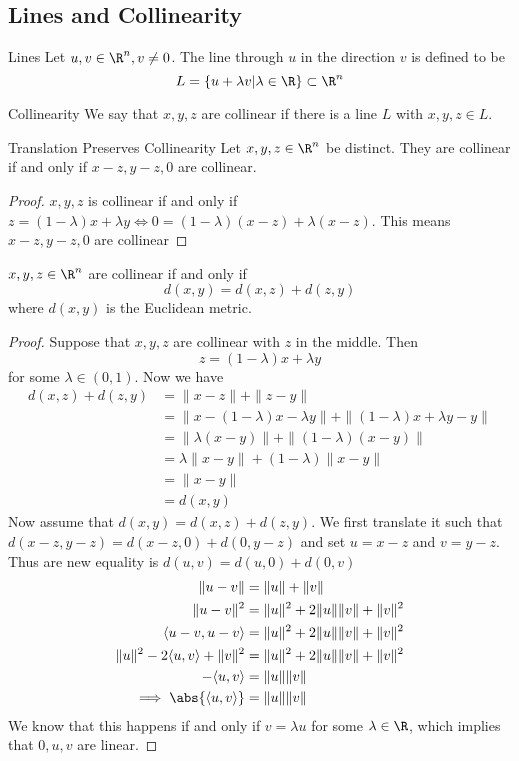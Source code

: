\subsection{Lines and Collinearity}
\begin{defn}{Lines}{} Let $u,v\in\R^n, v\neq 0$. The line through $u$ in the direction $v$ is defined to be $$L=\{u+\lambda v|\lambda\in\R\}\subset\R^n$$
\end{defn}

\begin{defn}{Collinearity}{} We say that $x,y,z$ are collinear if there is a line $L$ with $x,y,z\in L$. 
\end{defn}

\begin{lmm}{Translation Preserves Collinearity}{} Let $x,y,z\in\R^n$ be distinct. They are collinear if and only if $x-z,y-z,0$ are collinear. \tcbline\begin{proof} $x,y,z$ is collinear if and only if $z=(1-\lambda)x+\lambda y\iff 0=(1-\lambda)(x-z)+\lambda(x-z)$. This means $x-z,y-z,0$ are collinear
\end{proof}
\end{lmm}

\begin{prp}{}{} $x,y,z\in\R^n$ are collinear if and only if $$d(x,y)=d(x,z)+d(z,y)$$ where $d(x,y)$ is the Euclidean metric. \tcbline
\begin{proof} Suppose that $x,y,z$ are collinear with $z$ in the middle. Then $$z=(1-\lambda)x+\lambda y$$ for some $\lambda\in(0,1)$. Now we have 
\begin{align*}
d(x,z)+d(z,y)&=\|x-z\|+\|z-y\|\\
&=\|x-(1-\lambda)x-\lambda y\|+\|(1-\lambda)x+\lambda y-y\|\\
&=\|\lambda(x-y)\|+\|(1-\lambda)(x-y)\|\\
&=\lambda\|x-y\|+(1-\lambda)\|x-y\|\\
&=\|x-y\|\\
&=d(x,y)
\end{align*}
Now assume that $d(x,y)=d(x,z)+d(z,y)$. We first translate it such that $d(x-z,y-z)=d(x-z,0)+d(0,y-z)$ and set $u=x-z$ and $v=y-z$. Thus are new equality is $d(u,v)=d(u,0)+d(0,v)$
\begin{align*}
\|u-v\|&=\|u\|+\|v\|\\
\|u-v\|^2&=\|u\|^2+2\|u\|\|v\|+\|v\|^2\\
\langle u-v,u-v\rangle&=\|u\|^2+2\|u\|\|v\|+\|v\|^2\\
\|u\|^2-2\langle u,v\rangle+\|v\|^2&=\|u\|^2+2\|u\|\|v\|+\|v\|^2\\
-\langle u,v\rangle&=\|u\|\|v\|\\
\implies\abs{\langle u,v\rangle}&=\|u\|\|v\|\\
\end{align*}
We know that this happens if and only if $v=\lambda u$ for some $\lambda\in\R$, which implies that $0,u,v$ are linear. 
\end{proof}
\end{prp}

